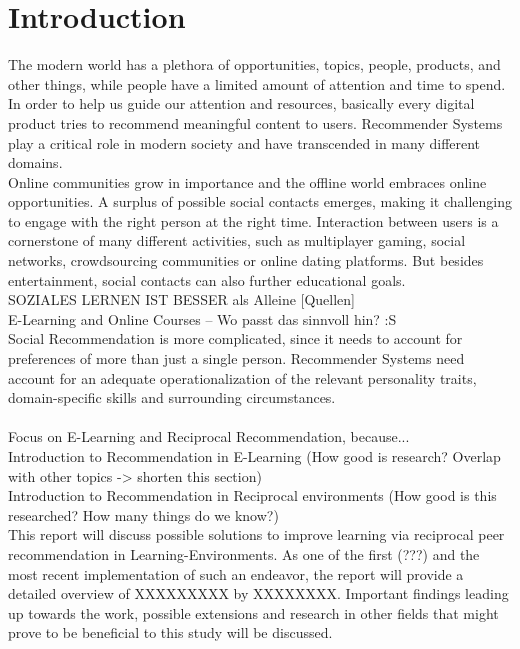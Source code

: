 \documentclass[nochapterpage,bigchapter,linedtoc,longdoc,colorback,accentcolor=tud3b]{tudreport}
\begin{document}
\chapter{Introduction}
The modern world has a plethora of opportunities, topics, people, products, and other things, while people have a limited amount of attention and time to spend. In order to help us guide our attention and resources, basically every digital product tries to recommend meaningful content to users. Recommender Systems play a critical role in modern society and have transcended in many different domains.\\
Online communities grow in importance and the offline world embraces online opportunities. A surplus of possible social contacts emerges, making it challenging to engage with the right person at the right time. 
Interaction between users is a cornerstone of many different activities, such as multiplayer gaming, social networks, crowdsourcing communities or online dating platforms. But besides entertainment, social contacts can also further educational goals.\\
SOZIALES LERNEN IST BESSER als Alleine [Quellen]\\
E-Learning and Online Courses -- Wo passt das sinnvoll hin? :S\\
Social Recommendation is more complicated, since it needs to account for preferences of more than just a single person. Recommender Systems need account for an adequate operationalization of the relevant personality traits, domain-specific skills and surrounding circumstances.\\
\\
Focus on E-Learning and Reciprocal Recommendation, because...\\
Introduction to Recommendation in E-Learning (How good is research? Overlap with other topics -> shorten this section)\\
Introduction to Recommendation in Reciprocal environments (How good is this researched? How many things do we know?)\\
This report will discuss possible solutions to improve learning via reciprocal peer recommendation in Learning-Environments. As one of the first (???) and the most recent implementation of such an endeavor, the report will provide a detailed overview of XXXXXXXXX by XXXXXXXX. Important findings leading up towards the work, possible extensions and research in other fields that might prove to be beneficial to this study will be discussed.\\
\end{document}
